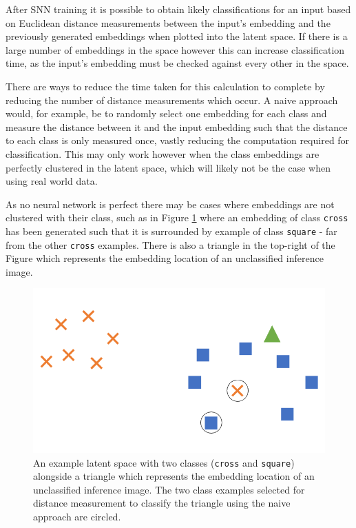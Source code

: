 After SNN training it is possible to obtain likely classifications for an input based on Euclidean distance measurements between the input's embedding and the previously generated embeddings when plotted into the latent space. If there is a large number of embeddings in the space however this can increase classification time, as the input's embedding must be checked against every other in the space. 

There are ways to reduce the time taken for this calculation to complete by reducing the number of distance measurements which occur. A naive approach would, for example, be to randomly select one embedding for each class and measure the distance between it and the input embedding such that the distance to each class is only measured once, vastly reducing the computation required for classification. This may only work however when the class embeddings are perfectly clustered in the latent space, which will likely not be the case when using real world data.

As no neural network is perfect there may be cases where embeddings are not clustered with their class, such as in Figure \ref{fig:naive-embedding-example} where an embedding of class \texttt{cross} has been generated such that it is surrounded by example of class \texttt{square} - far from the other \texttt{cross} examples. There is also a triangle in the top-right of the Figure which represents the embedding location of an unclassified inference image. 

 \begin{figure}[h]
	\begin{center}
		\includegraphics[scale=0.5]{Chapter5/figs/naive-embedding-example.png}
	\end{center}
	\caption{An example latent space with two classes (\texttt{cross} and \texttt{square}) alongside a triangle which represents the embedding location of an unclassified inference image. The two class examples selected for distance measurement to classify the triangle using the naive approach are circled.}
	\label{fig:naive-embedding-example}
\end{figure}

